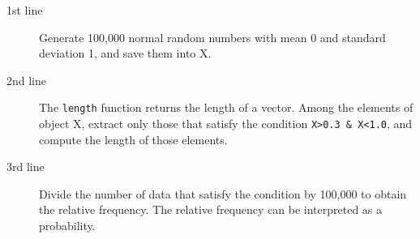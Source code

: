 \begin{description}
	\item[1st line] Generate 100,000 normal random numbers with mean 0 and standard deviation 1, and save them into X.
	\item[2nd line] The \texttt{length} function returns the length of a vector. Among the elements of object X, extract only those that satisfy the condition \verb|X>0.3 & X<1.0|, and compute the length of those elements.
	\item[3rd line] Divide the number of data that satisfy the condition by 100,000 to obtain the relative frequency. The relative frequency can be interpreted as a probability.
\end{description}
